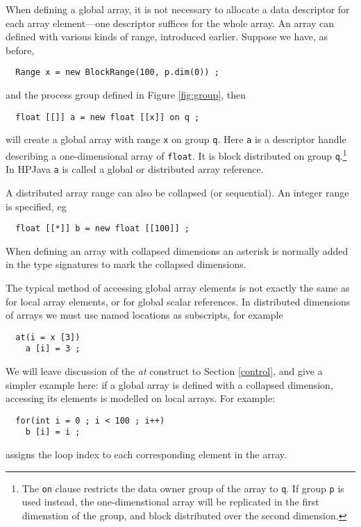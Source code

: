 When defining a global array, it is not necessary to allocate a data
descriptor for each array element---one descriptor suffices for the whole
array.
An array can defined with various kinds of range, introduced earlier.
Suppose we have, as before,
\small
\begin{verbatim}
  Range x = new BlockRange(100, p.dim(0)) ;
\end{verbatim}
\normalsize
and the process group defined in Figure \ref{fig:group}, then
\small
\begin{verbatim}
  float [[]] a = new float [[x]] on q ;
\end{verbatim}
\normalsize
will create a global array with range \texttt{x} on group \texttt{q}.
Here \texttt{a} is a descriptor handle describing a one-dimensional
array of \texttt{float}. It is block distributed on group
\texttt{q}.\footnote{The \texttt{on} clause restricts the data owner
group of the array to \texttt{q}. If group \texttt{p} is used instead,
the one-dimenstional array will be replicated in the first dimenstion of
the group, and block distributed over the second dimension.} In
HPJava \texttt{a} is called a 
 global or distributed
array reference.

A distributed array range can also be collapsed (or
sequential).  An integer range is specified, eg
\small
\begin{verbatim}
  float [[*]] b = new float [[100]] ;
\end{verbatim}
\normalsize
When defining an array with collapsed dimensions an asterisk is
normally added in the type signatures to mark the collapsed
dimensions.

The typical method of accessing global array elements is not exactly
the same as for local array elements, or for global scalar references.
In distributed dimensions of arrays
we must use named locations as subscripts, for example
\small
\begin{verbatim}
  at(i = x [3])
    a [i] = 3 ;
\end{verbatim}
\normalsize
We will leave discussion of the {\em at} construct to Section
\ref{control}, and give a simpler example here:
if a global array is defined with a collapsed dimension, accessing
its elements is modelled on local arrays.  For example:
\small
\begin{verbatim}
  for(int i = 0 ; i < 100 ; i++)
    b [i] = i ;
\end{verbatim}
\normalsize
assigns the loop index to each corresponding element in the array.

